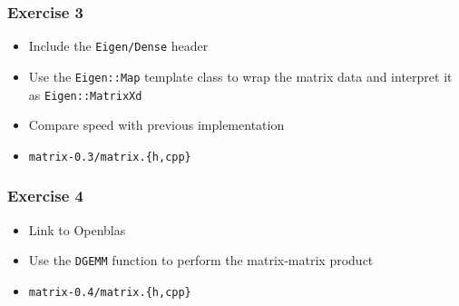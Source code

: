 \documentclass[smaller,a4paper,allowframebreaks]{beamer}
\begin{document}
\begin{frame}
\frametitle{Exercise 3}

\begin{itemize}
\item Include the {\tt Eigen/Dense} header
\item Use the {\tt Eigen::Map} template class to wrap the matrix data and interpret it as {\tt Eigen::MatrixXd}
\item Compare speed with previous implementation
\item {\tt matrix-0.3/matrix.\{h,cpp\}}
\end{itemize}
\end{frame}

\begin{frame}
\frametitle{Exercise 4}

\begin{itemize}
\item Link to Openblas
\item Use the {\tt DGEMM} function to perform the matrix-matrix product
\item {\tt matrix-0.4/matrix.\{h,cpp\}}
\end{itemize}
\end{frame}
\end{document}
